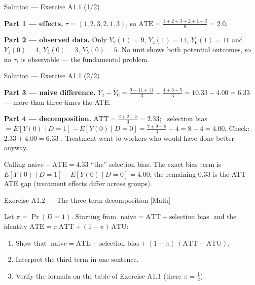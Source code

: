 \documentclass[aspectratio=169,11pt]{beamer}
\begin{document}
\begin{frame}{Solution --- Exercise A1.1 (1/2)}
\begin{solutionbox}
  \textbf{Part 1 --- effects.} $\tau = (1,2,3,2,1,3)$, so
  $\text{ATE} = \tfrac{1+2+3+2+1+3}{6} = \mathbf{2.0}$.

  \smallskip
  \textbf{Part 2 --- observed data.} Only $Y_2(1)=9$, $Y_4(1)=11$, $Y_6(1)=11$ and
  $Y_1(0)=4$, $Y_3(0)=3$, $Y_5(0)=5$. No unit shows both potential outcomes, so no
  $\tau_i$ is observable --- the fundamental problem.
\end{solutionbox}
\end{frame}

\begin{frame}{Solution --- Exercise A1.1 (2/2)}
\begin{solutionbox}
  \smallskip
  \textbf{Part 3 --- naive difference.}
  $\bar Y_1 - \bar Y_0 = \tfrac{9+11+11}{3} - \tfrac{4+3+5}{3} = 10.33 - 4.00 = \mathbf{6.33}$
  --- more than three times the ATE.

  \smallskip
  \textbf{Part 4 --- decomposition.}
  $\text{ATT} = \tfrac{2+2+3}{3} = 2.33$; \ selection bias
  $= E[Y(0)\mid D{=}1] - E[Y(0)\mid D{=}0] = \tfrac{7+9+8}{3} - 4 = 8 - 4 = 4.00$.
  Check: $2.33 + 4.00 = 6.33$ \checkmark. Treatment went to workers who would have done
  better anyway.
\end{solutionbox}
\begin{mistake}
  Calling $\text{naive} - \text{ATE} = 4.33$ ``the'' selection bias. The exact bias term is
  $E[Y(0)\mid D{=}1]-E[Y(0)\mid D{=}0]=4.00$; the remaining $0.33$ is the ATT--ATE gap
  (treatment effects differ across groups).
\end{mistake}
\end{frame}

\begin{frame}{Exercise A1.2 --- The three-term decomposition [Math]}
\begin{exercise}
  Let $\pi = \Pr(D=1)$. Starting from
  $\;\text{naive} = \text{ATT} + \text{selection bias}\;$ and the identity
  $\text{ATE} = \pi\,\text{ATT} + (1-\pi)\,\text{ATU}$:
  \begin{enumerate}
    \item Show that
          $\;\text{naive} = \text{ATE} + \text{selection bias} +
          (1-\pi)\,(\text{ATT}-\text{ATU})$.
    \item Interpret the third term in one sentence.
    \item Verify the formula on the table of Exercise A1.1 (there $\pi = \tfrac12$).
  \end{enumerate}
\end{exercise}
\end{frame}
\end{document}
